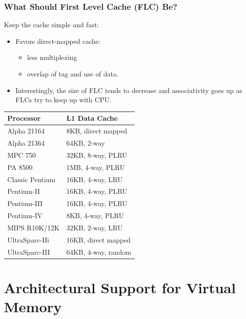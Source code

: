 \documentclass{beamer}
\begin{document}
\begin{frame}[fragile,t]
\frametitle{What Should First Level Cache (FLC) Be?}
\pause

Keep the cache simple and fast:\smallskip
\begin{itemize}
    \item Favors direct-mapped cache:
        \begin{itemize}
            \item less multiplexing
            \item overlap of tag and use of data.
        \end{itemize}\smallskip
    \item Interestingly, the size of FLC tends to decrease and
            associativity goes up as FLCs try to keep up with CPU.
\end  {itemize}

\begin{scriptsize}
\begin{tabular}{ll}
\hline
Processor    &  L1 Data Cache\\\hline
Alpha 21164  &  8KB, direct mapped\\\hline
Alpha 21364  &  64KB, 2-way\\\hline
MPC 750  &  32KB, 8-way, PLRU\\\hline
PA 8500  &  1MB, 4-way, PLRU\\\hline
Classic Pentium  &  16KB, 4-way, LRU\\\hline
Pentium-II  &  16KB, 4-way, PLRU\\\hline
Pentium-III  &  16KB, 4-way, PLRU\\\hline
Pentium-IV  &  8KB, 4-way, PLRU\\\hline
MIPS R10K/12K  &  32KB, 2-way, LRU\\\hline
UltraSparc-IIi  &  16KB, direct mapped\\\hline
UltraSparc-III  &  64KB, 4-way, random\\\hline
\end{tabular}
\end{scriptsize}
\end{frame}

\section{Architectural Support for Virtual Memory}

\begin{frame}[fragile]
	\tableofcontents[currentsection]
\end{frame}
\end{document}
